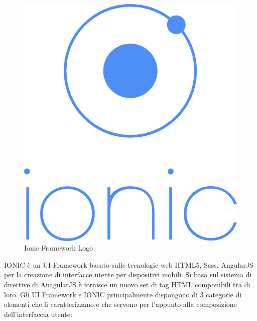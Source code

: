 \begin{figure}
  \vspace{-65pt}
  \begin{center}
    \includegraphics[scale=0.35]{Figures/ionic-logo.png}
  \end{center}
  \vspace{-10pt}
  \caption{Ionic Framework Logo}
  \label{fig:IONIC}
  \vspace{-10pt}
\end{figure}
IONIC è un UI Framework basato sulle tecnologie web HTML5, Sass, AngularJS per la creazione di interfacce utente per dispositivi mobili. Si basa sul sistema di direttive di AnagularJS è fornisce un nuovo set di tag HTML componibili tra di loro. 
Gli UI Framework e IONIC principalmente dispongono di 3 categorie di elementi che li caratterizzano e che servono per l'appunto alla composizione dell'interfaccia utente:

